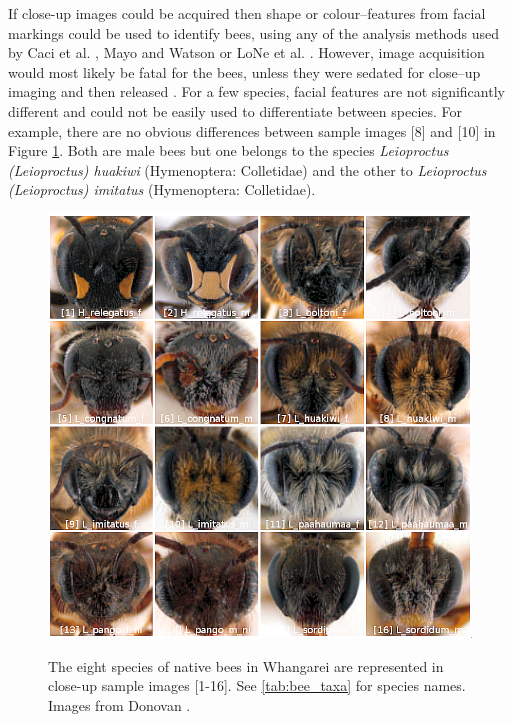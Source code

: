 If close-up images could be acquired then shape or colour--features from facial markings could be used to identify bees, using any of the analysis methods used by Caci et al. \cite{Caci2013}, Mayo and Watson \cite{Mayo2007} or LoNe et al. \cite{Lone2011}. However, image acquisition would most likely be fatal for the bees, unless they were sedated for close--up imaging and then released \cite{Arbuckle2001}. For a few species, facial features are not significantly different and could not be easily used to differentiate between species. For example, there are no obvious differences between sample images [8] and [10] in Figure \ref{fig:face}. Both are male bees but one belongs to the species \emph{Leioproctus (Leioproctus) huakiwi} (Hymenoptera: Colletidae) and the other to \emph{Leioproctus (Leioproctus) imitatus} (Hymenoptera: Colletidae). 

\begin{figure}[!htbp]
\myfloatalign
\includegraphics[width=.85\linewidth]{gfx2/bee_face} \\
\caption[The eight species of native bees in Whangarei.]{The eight species of native bees in Whangarei are represented in close-up sample images [1-16]. See \ref{tab:bee_taxa} for species names. Images from Donovan \cite[pp.130--231]{Donovan2007}.} 
\label{fig:face}
\end{figure}

